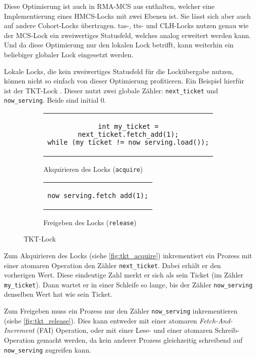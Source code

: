 Diese Optimierung ist auch in RMA-MCS aus \cite{RMA-RW} enthalten,
welcher eine Implementierung eines HMCS-Locks mit zwei Ebenen ist.
Sie lässt sich aber auch auf andere Cohort-Locks übertragen.
\gls{tas}-, \gls{tts}- und CLH-Locks nutzen genau wie der MCS-Lock ein zweiwertiges Statusfeld,
welches analog erweitert werden kann.
Und da diese Optimierung nur den lokalen Lock betrifft,
kann weiterhin ein beliebiger globaler Lock eingesetzt werden.

\clearpage

Lokale Locks,
die kein zweiwertiges Statusfeld für die Lockübergabe nutzen,
können nicht so einfach von dieser Optimierung profitieren.
Ein Beispiel hierfür ist der TKT-Lock \cite{TKT-Lock}.
Dieser nutzt zwei globale Zähler:
\texttt{next\_ticket} und \texttt{now\_serving}.
Beide sind initial 0.

\begin{figure}[h]
    \begin{subfigure}[b]{.5\textwidth}
        \centering
        \begin{tabular}{c}\begin{lstlisting}
int my_ticket = next_ticket.fetch_add(1);
while (my_ticket != now_serving.load());
        \end{lstlisting}\end{tabular}
        \caption{Akquirieren des Locks (\texttt{acquire})}
        \label{fig:tkt_acquire}
    \end{subfigure}
    \begin{subfigure}[b]{.5\textwidth}
        \centering
        \begin{tabular}{c}\begin{lstlisting}
now_serving.fetch_add(1);
        \end{lstlisting}\end{tabular}
        \caption{Freigeben des Locks (\texttt{release})}
        \label{fig:tkt_release}
    \end{subfigure}
    \caption{TKT-Lock}
    \label{fig:tkt_code}
\end{figure}

Zum Akquirieren des Locks (siehe \autoref{fig:tkt_acquire}) inkrementiert ein Prozess
mit einer atomaren Operation
den Zähler \texttt{next\_ticket}.
Dabei erhält er den vorherigen Wert.
Diese eindeutige Zahl merkt er sich als sein Ticket (im Zähler \texttt{my\_ticket}).
Dann wartet er in einer Schleife so lange,
bis der Zähler \texttt{now\_serving} denselben Wert hat wie sein Ticket.

Zum Freigeben muss ein Prozess nur den Zähler \texttt{now\_serving} inkrementieren
(siehe \autoref{fig:tkt_release}).
Dies kann entweder mit einer atomaren \textit{Fetch-And-Increment} (FAI) Operation,
oder mit einer Lese- und einer atomaren Schreib-Operation gemacht werden,
da kein anderer Prozess gleichzeitig schreibend auf \texttt{now\_serving} zugreifen kann.


